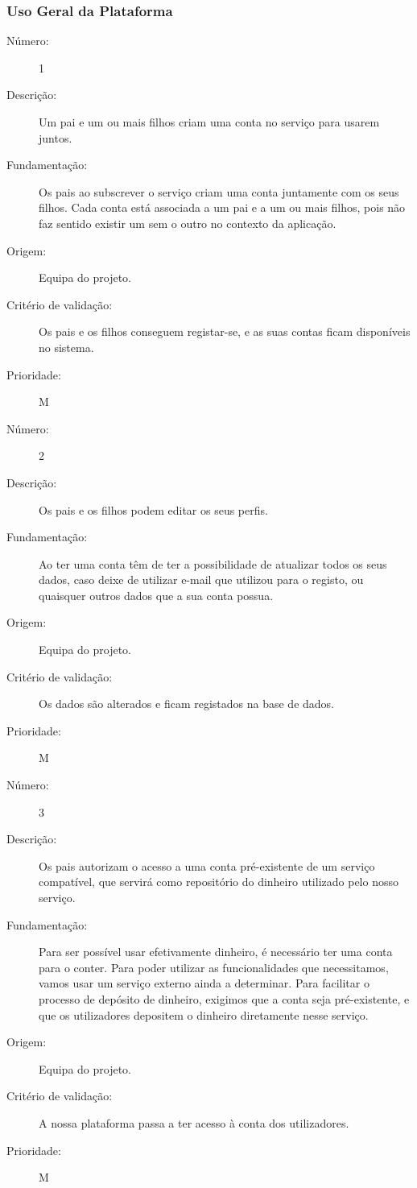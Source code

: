 \documentclass[12pt,a4paper]{article}
\begin{document}
    \subsubsection{Uso Geral da Plataforma}

      \begin{description}
        \item[Número:]1
        \item[Descrição:] Um pai e um ou mais filhos criam uma conta no serviço para usarem juntos.
        \item[Fundamentação:] Os pais ao subscrever o serviço criam uma conta juntamente com os seus filhos. Cada conta está associada a um pai e a um ou mais filhos, pois não faz sentido existir um sem o outro no contexto da aplicação.
        \item[Origem:]Equipa do projeto.
        \item[Critério de validação:]Os pais e os filhos conseguem registar-se, e as suas contas ficam disponíveis no sistema.
        \item[Prioridade:]M
      \end{description}
      \vspace{0.5cm}
      \begin{description}
        \item[Número:]2
        \item[Descrição:] Os pais e os filhos podem editar os seus perfis.
        \item[Fundamentação:]Ao ter uma conta têm de ter a possibilidade de atualizar todos os seus dados, caso deixe de utilizar e-mail que utilizou para o registo, ou quaisquer outros dados que a sua conta possua.
        \item[Origem:]Equipa do projeto.
        \item[Critério de validação:]Os dados são alterados e ficam registados na base de dados.
        \item[Prioridade:]M
      \end{description}
      \vspace{0.5cm}
      \begin{description}
        \item[Número:]3
        \item[Descrição:]Os pais autorizam o acesso a uma conta pré-existente de um serviço compatível, que servirá como repositório do dinheiro utilizado pelo nosso serviço.
        \item[Fundamentação:] Para ser possível usar efetivamente dinheiro, é necessário ter uma conta para o conter. Para poder utilizar as funcionalidades que necessitamos, vamos usar um serviço externo ainda a determinar. Para facilitar o processo de depósito de dinheiro, exigimos que a conta seja pré-existente, e que os utilizadores depositem o dinheiro diretamente nesse serviço. 
        \item[Origem:] Equipa do projeto.
        \item[Critério de validação:]A nossa plataforma passa a ter acesso à conta dos utilizadores.
        \item[Prioridade:]M
      \end{description}
\end{document}

